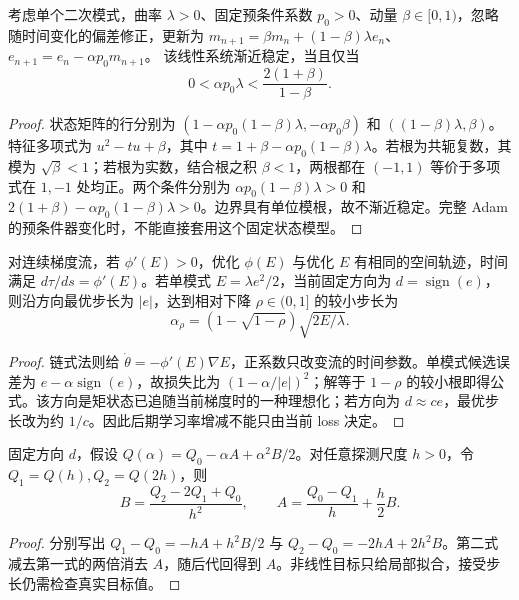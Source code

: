 \begin{proposition}[固定预条件器动量系统的稳定区间]
\label{prop:momentum-stability}
考虑单个二次模式，曲率 $\lambda>0$、固定预条件系数 $p_0>0$、动量 $\beta\in[0,1)$，忽略随时间变化的偏差修正，更新为
$m_{n+1}=\beta m_n+(1-\beta)\lambda e_n$、
$e_{n+1}=e_n-\alpha p_0m_{n+1}$。
该线性系统渐近稳定，当且仅当
\begin{equation}
0<\alpha p_0\lambda<\frac{2(1+\beta)}{1-\beta}.
\end{equation}
\end{proposition}
\begin{proof}
状态矩阵的行分别为 $(1-\alpha p_0(1-\beta)\lambda,-\alpha p_0\beta)$ 和 $((1-\beta)\lambda,\beta)$。特征多项式为 $u^2-tu+\beta$，其中 $t=1+\beta-\alpha p_0(1-\beta)\lambda$。若根为共轭复数，其模为 $\sqrt\beta<1$；若根为实数，结合根之积 $\beta<1$，两根都在 $(-1,1)$ 等价于多项式在 $1,-1$ 处均正。两个条件分别为 $\alpha p_0(1-\beta)\lambda>0$ 和 $2(1+\beta)-\alpha p_0(1-\beta)\lambda>0$。边界具有单位模根，故不渐近稳定。完整 Adam 的预条件器变化时，不能直接套用这个固定状态模型。
\end{proof}

\begin{proposition}[损失变换与单模式方向步长]
\label{prop:loss-transform}
对连续梯度流，若 $\phi'(E)>0$，优化 $\phi(E)$ 与优化 $E$ 有相同的空间轨迹，时间满足 $d\tau/ds=\phi'(E)$。若单模式 $E=\lambda e^2/2$，当前固定方向为 $d=\operatorname{sign}(e)$，则沿方向最优步长为 $|e|$，达到相对下降 $\rho\in(0,1]$ 的较小步长为
\begin{equation}
\alpha_\rho=(1-\sqrt{1-\rho})\sqrt{2E/\lambda}.
\end{equation}
\end{proposition}
\begin{proof}
链式法则给 $\dot\theta=-\phi'(E)\nabla E$，正系数只改变流的时间参数。单模式候选误差为 $e-\alpha\operatorname{sign}(e)$，故损失比为 $(1-\alpha/|e|)^2$；解等于 $1-\rho$ 的较小根即得公式。该方向是矩状态已追随当前梯度时的一种理想化；若方向为 $d\approx ce$，最优步长改为约 $1/c$。因此后期学习率增减不能只由当前 loss 决定。
\end{proof}

\begin{proposition}[三点函数值恢复方向二次式]
\label{prop:three-point}
固定方向 $d$，假设 $Q(\alpha)=Q_0-\alpha A+\alpha^2B/2$。对任意探测尺度 $h>0$，令 $Q_1=Q(h),Q_2=Q(2h)$，则
\begin{equation}
B=\frac{Q_2-2Q_1+Q_0}{h^2},\qquad
A=\frac{Q_0-Q_1}{h}+\frac h2B.
\end{equation}
\end{proposition}
\begin{proof}
分别写出 $Q_1-Q_0=-hA+h^2B/2$ 与 $Q_2-Q_0=-2hA+2h^2B$。第二式减去第一式的两倍消去 $A$，随后代回得到 $A$。非线性目标只给局部拟合，接受步长仍需检查真实目标值。
\end{proof}

